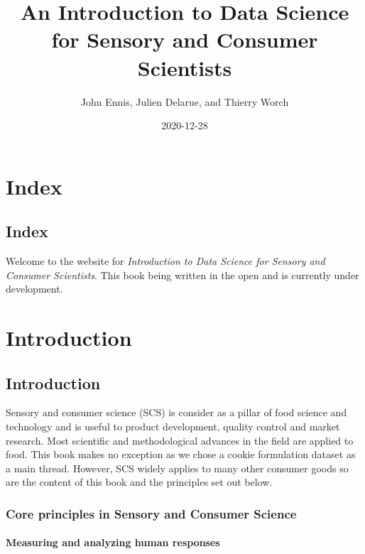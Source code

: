 \documentclass[
]{book}
\title{An Introduction to Data Science for Sensory and Consumer Scientists}
\author{John Ennis, Julien Delarue, and Thierry Worch}
\date{2020-12-28}
\begin{document}
\maketitle

{
\setcounter{tocdepth}{1}
\tableofcontents
}
\hypertarget{part-index}{%
\part*{Index}\label{part-index}}

\hypertarget{index}{%
\chapter{Index}\label{index}}

Welcome to the website for \emph{Introduction to Data Science for Sensory and Consumer Scientists}. This book being written in the open and is currently under development.

\hypertarget{part-introduction}{%
\part*{Introduction}\label{part-introduction}}

\hypertarget{intro}{%
\chapter{Introduction}\label{intro}}

Sensory and consumer science (SCS) is consider as a pillar of food science and technology and is useful to product development, quality control and market research. Most scientific and methodological advances in the field are applied to food. This book makes no exception as we chose a cookie formulation dataset as a main thread. However, SCS widely applies to many other consumer goods so are the content of this book and the principles set out below.

\hypertarget{core-principles-in-sensory-and-consumer-science}{%
\section{Core principles in Sensory and Consumer Science}\label{core-principles-in-sensory-and-consumer-science}}

\hypertarget{measuring-and-analyzing-human-responses}{%
\subsection{Measuring and analyzing human responses}\label{measuring-and-analyzing-human-responses}}
\end{document}
